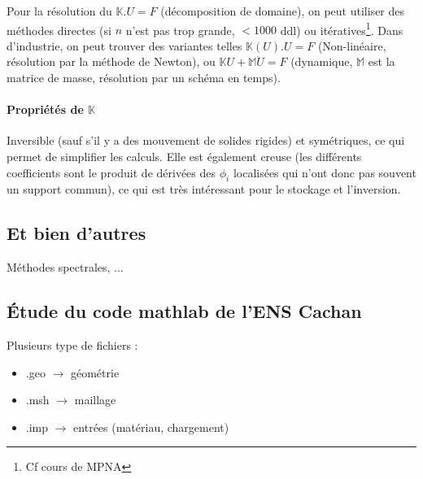 \documentclass{article}
\begin{document}
Pour la résolution du $\mathbb{K}.U=F$ (décomposition de domaine), on peut utiliser des méthodes directes (si $n$ n'est pas trop grande, $< 1000$ ddl) ou itératives\footnote{Cf cours de MPNA}. Dans d'industrie, on peut trouver des variantes telles $\mathbb{K}(U).U=F$ (Non-linéaire, résolution par la méthode de Newton), ou $\mathbb{K}U+\mathbb{M}\ddot{U} = F$ (dynamique, $\mathbb{M}$ est la matrice de masse, résolution par un schéma en temps).

\paragraph{Propriétés de $\mathbb{K}$} Inversible (sauf s'il y a des mouvement de solides rigides) et symétriques, ce qui permet de simplifier les calculs. Elle est également creuse (les différents coefficients sont le produit de dérivées des $\phi_i$ localisées qui n'ont donc pas souvent un support commun), ce qui est très intéressant pour le stockage et l'inversion.

\subsection{Et bien d'autres}
Méthodes spectrales, ...

\subsection{Étude du code mathlab de l'ENS Cachan}
Plusieurs type de fichiers :
\begin{itemize}
\item .geo $\to$ géométrie
\item .msh $\to$ maillage
\item .imp $\to$ entrées (matériau, chargement)
\end{itemize}
\end{document}
